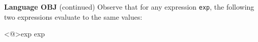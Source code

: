\begin{minipage}[t]{\sw}
\slidenumber
\LARGE
{\bf Language OBJ} (continued)\exx
Observe that for any expression \verb'exp',
the following two expressions evaluate to the same values:
\begin{qv}
<@>exp
exp
\end{qv}
\end{minipage}
